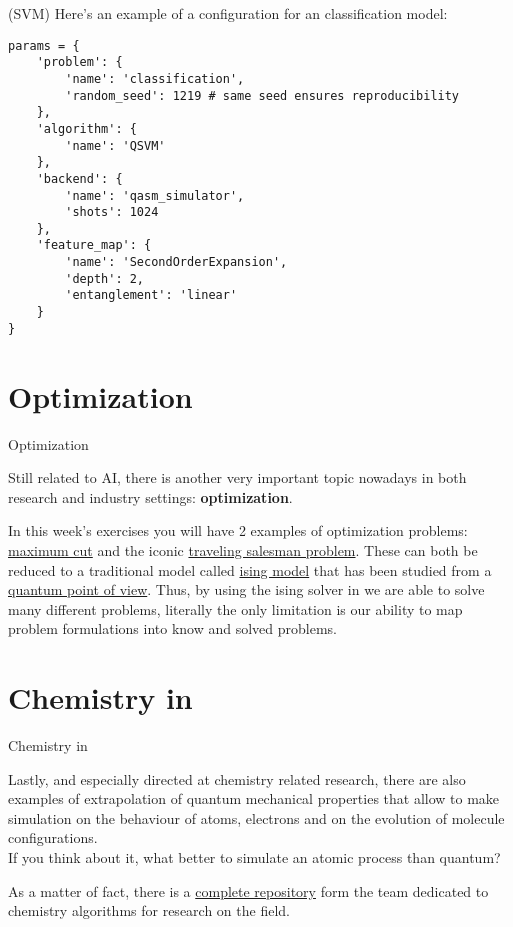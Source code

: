 \documentclass[aspectratio=43]{beamer}
\begin{document}
\begin{frame}[fragile]{\ai (SVM)}
\small{Here's an example of a configuration for an classification model:}\begin{verbatim}
params = {
    'problem': {
        'name': 'classification',
        'random_seed': 1219 # same seed ensures reproducibility
    },
    'algorithm': {
        'name': 'QSVM'
    },
    'backend': {
        'name': 'qasm_simulator',
        'shots': 1024
    },
    'feature_map': {
        'name': 'SecondOrderExpansion',
        'depth': 2,
        'entanglement': 'linear'
    }
}
\end{verbatim}
\end{frame}

\section{Optimization}
\begin{frame}{Optimization}
\begin{cardTiny}
    Still related to AI, there is another very important topic nowadays in both research and industry settings: \textbf{optimization}.
\end{cardTiny}
\begin{cardTiny}
    In this week's exercises you will have 2 examples of optimization problems: \href{https://en.wikipedia.org/wiki/Maximum_cut}{maximum cut} and the iconic \href{https://en.wikipedia.org/wiki/Travelling_salesman_problem}{traveling salesman problem}. These can both be reduced to a traditional model called \href{https://en.wikipedia.org/wiki/Ising_model}{ising model} that has been studied from a \href{https://arxiv.org/ftp/arxiv/papers/1210/1210.0113.pdf}{quantum point of view}. Thus, by using the ising solver in \qka we are able to solve many different problems, literally the only limitation is our ability to map problem formulations into know and solved problems.
\end{cardTiny}
\pagenumber
\end{frame}




\section{Chemistry in \qka}
\begin{frame}{Chemistry in \qka}
\begin{card}
    Lastly, and especially directed at chemistry related research, there are also examples of extrapolation of quantum mechanical properties that allow to make simulation on the behaviour of atoms, electrons and on the evolution of molecule configurations.\\ If you think about it, what better to simulate an atomic process than quantum?
\end{card}
\begin{card}
    As a matter of fact, there is a \href{https://github.com/Qiskit/aqua-chemistry}{complete repository} form the \qk team dedicated to chemistry algorithms for research on the field.
\end{card}
\pagenumber
\end{frame}
\end{document}
